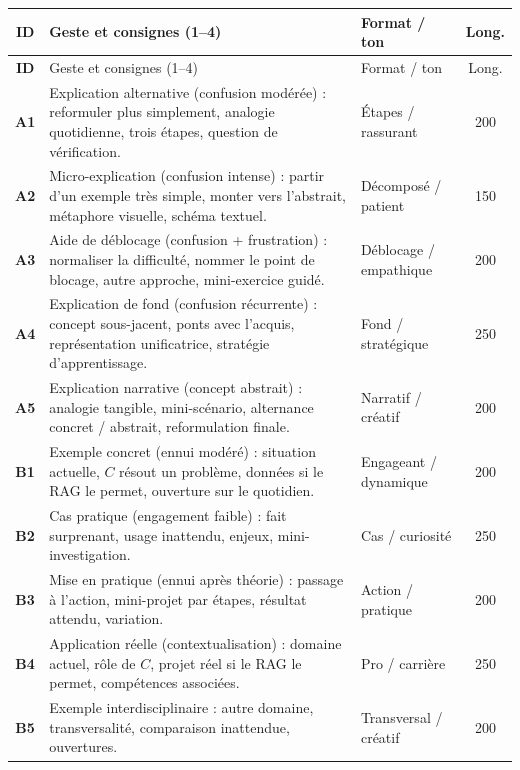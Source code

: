 {\small
\renewcommand{\arraystretch}{1.22}
\setlength{\tabcolsep}{3pt}
\begin{xltabular}{\textwidth}{|>{\bfseries}c|>{\raggedright\arraybackslash}X|>{\raggedright\arraybackslash}p{2.35cm}|c|}
\hline
{}
ID & Geste et consignes (1--4) & Format / ton & Long. \\
\hline
\endfirsthead
\hline
{}
ID & Geste et consignes (1--4) & Format / ton & Long. \\
\hline
\endhead
\endfoot
\endlastfoot
A1 & Explication alternative (confusion modérée) :
reformuler plus simplement, analogie quotidienne, 
trois étapes, question de vérification. & Étapes / rassurant & 200 \\
\hline
A2 & Micro-explication (confusion intense) :
partir d'un exemple très simple, monter vers l'abstrait, 
métaphore visuelle, schéma textuel. & Décomposé / patient & 150 \\
\hline
A3 & Aide de déblocage (confusion + frustration) :
normaliser la difficulté, nommer le point de blocage, 
autre approche, mini-exercice guidé. & Déblocage / empathique & 200 \\
\hline
A4 & Explication de fond (confusion récurrente) :
concept sous-jacent, ponts avec l'acquis, 
représentation unificatrice, stratégie d'apprentissage. & Fond / stratégique & 250 \\
\hline
A5 & Explication narrative (concept abstrait) :
analogie tangible, mini-scénario, 
alternance concret / abstrait, reformulation finale. & Narratif / créatif & 200 \\
\hline
B1 & Exemple concret (ennui modéré) :
situation actuelle, $C$ résout un problème, 
données si le RAG le permet, ouverture sur le quotidien. & Engageant / dynamique & 200 \\
\hline
B2 & Cas pratique (engagement faible) :
fait surprenant, usage inattendu, 
enjeux, mini-investigation. & Cas / curiosité & 250 \\
\hline
B3 & Mise en pratique (ennui après théorie) :
passage à l'action, mini-projet par étapes, 
résultat attendu, variation. & Action / pratique & 200 \\
\hline
B4 & Application réelle (contextualisation) :
domaine actuel, rôle de $C$, 
projet réel si le RAG le permet, compétences associées. & Pro / carrière & 250 \\
\hline
B5 & Exemple interdisciplinaire :
autre domaine, transversalité, 
comparaison inattendue, ouvertures. & Transversal / créatif & 200 \\

\end{xltabular}}
